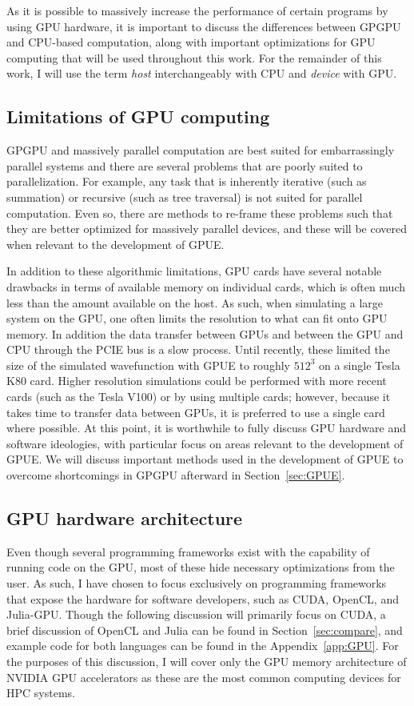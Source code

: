 As it is possible to massively increase the performance of certain programs by using GPU hardware, it is important to discuss the differences between GPGPU and CPU-based computation, along with important optimizations for GPU computing that will be used throughout this work.
For the remainder of this work, I will use the term \textit{host} interchangeably with CPU and \textit{device} with GPU.

\subsection{Limitations of GPU computing}

GPGPU and massively parallel computation are best suited for embarrassingly parallel systems and there are several problems that are poorly suited to parallelization.
For example, any task that is inherently iterative (such as summation) or recursive (such as tree traversal) is not suited for parallel computation.
Even so, there are methods to re-frame these problems such that they are better optimized for massively parallel devices, and these will be covered when relevant to the development of GPUE.

In addition to these algorithmic limitations, GPU cards have several notable drawbacks in terms of available memory on individual cards, which is often much less than the amount available on the host.
As such, when simulating a large system on the GPU, one often limits the resolution to what can fit onto GPU memory.
In addition the data transfer between GPUs and between the GPU and CPU through the PCIE bus is a slow process.
Until recently, these limited the size of the simulated wavefunction with GPUE to roughly $512^3$ on a single Tesla K80 card.
Higher resolution simulations could be performed with more recent cards (such as the Tesla V100) or by using multiple cards; however, because it takes time to transfer data between GPUs, it is preferred to use a single card where possible.
At this point, it is worthwhile to fully discuss GPU hardware and software ideologies, with particular focus on areas relevant to the development of GPUE.
We will discuss important methods used in the development of GPUE to overcome shortcomings in GPGPU afterward in Section~\ref{sec:GPUE}.

\subsection{GPU hardware architecture}

Even though several programming frameworks exist with the capability of running code on the GPU, most of these hide necessary optimizations from the user.
As such, I have chosen to focus exclusively on programming frameworks that expose the hardware for software developers, such as CUDA, OpenCL, and Julia-GPU.
Though the following discussion will primarily focus on CUDA, a brief discussion of OpenCL and Julia can be found in Section~\ref{sec:compare}, and example code for both languages can be found in the Appendix~\ref{app:GPU}.
For the purposes of this discussion, I will cover only the GPU memory architecture of NVIDIA GPU accelerators as these are the most common computing devices for HPC systems.

